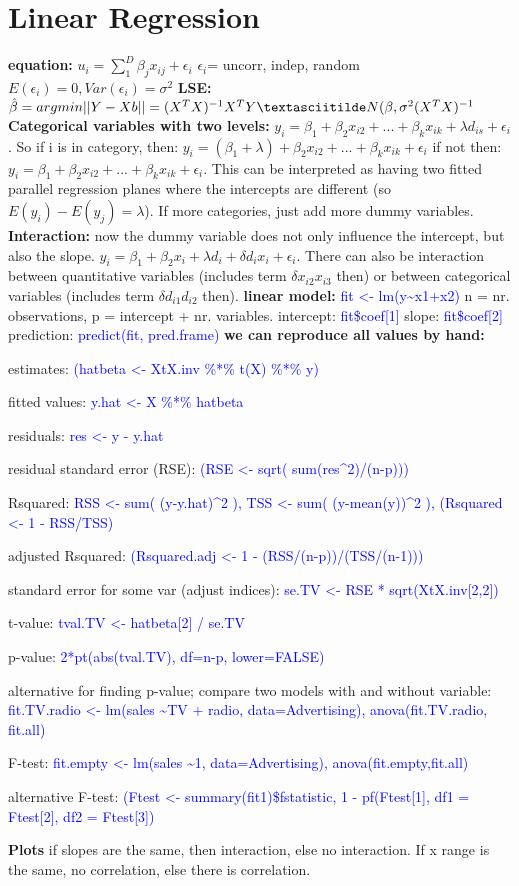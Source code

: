 \section{Linear Regression}
\textbf{equation: }$u_i = \sum_1^D \beta_j x_{ij} + \epsilon_i$
$\epsilon_i $= uncorr, indep, random $E(\epsilon_i) = 0, Var(\epsilon_i) = \sigma^2$
\textbf{LSE:} $\hat\beta = argmin ||Y-Xb|| = (X^TX)^{-1}X^TY \textasciitilde N(\beta,\sigma^2(X^TX)^{-1}$
\textbf{Categorical variables with two levels: } $y_i = \beta_1 + \beta_2 x_{i2}+...+\beta_k x_{ik}+\lambda d_{is}+\epsilon_i$. So if i is in category, then: $y_i = (\beta_1+\lambda) + \beta_2x_{i2}+...+\beta_k x_{ik}+\epsilon_i$ if not then: $y_i = \beta_1 + \beta_2x_{i2}+...+\beta_k x_{ik}+\epsilon_i$. This can be interpreted as having two fitted parallel regression planes where the intercepts are different (so $E(y_i)-E(y_j) = \lambda$). If more categories, just add more dummy variables.
\textbf{Interaction: } now the dummy variable does not only influence the intercept, but also the slope. $y_i = \beta_1 + \beta_2x_i + \lambda d_i + \delta d_i x_i + \epsilon_i$. There can also be interaction between quantitative variables (includes term $\delta x_{i2}x_{i3}$ then) or between categorical variables (includes term $\delta d_{i1}d_{i2}$ then).
\textbf{linear model:} \textcolor{blue}{fit <- lm(y\textasciitilde x1+x2)}
n = nr. observations, p = intercept + nr. variables. intercept: \textcolor{blue}{fit\$coef[1]} slope: \textcolor{blue}{fit\$coef[2]} prediction: \textcolor{blue}{predict(fit, pred.frame)}
\textbf{we can reproduce all values by hand: }
\begin{inparaitem}
\item estimates: \textcolor{blue}{(hatbeta <- XtX.inv \%*\% t(X) \%*\% y) }
\item fitted values: \textcolor{blue}{y.hat <- X \%*\% hatbeta}
\item residuals: \textcolor{blue}{res <- y - y.hat}
\item residual standard error (RSE): \textcolor{blue}{(RSE <- sqrt( sum(res\^{}2)/(n-p)))}
\item Rsquared: \textcolor{blue}{RSS <- sum( (y-y.hat)\^{}2 ),
TSS <- sum( (y-mean(y))\^{}2 ),
(Rsquared <- 1 - RSS/TSS) }
\item adjusted Rsquared: \textcolor{blue}{(Rsquared.adj <- 1 - (RSS/(n-p))/(TSS/(n-1)))}
\item standard error for some var (adjust indices): \textcolor{blue}{se.TV <- RSE * sqrt(XtX.inv[2,2])}
\item t-value: \textcolor{blue}{tval.TV <- hatbeta[2] / se.TV}
\item p-value: \textcolor{blue}{2*pt(abs(tval.TV), df=n-p, lower=FALSE)}
\item alternative for finding p-value; compare two models with and without variable: 
\textcolor{blue}{fit.TV.radio <- lm(sales \textasciitilde TV + radio, data=Advertising), anova(fit.TV.radio, fit.all)}
\item F-test: \textcolor{blue}{fit.empty <- lm(sales \textasciitilde 1, data=Advertising),
anova(fit.empty,fit.all)} 
\item alternative F-test: \textcolor{blue}{(Ftest <- summary(fit1)\$fstatistic, 1 - pf(Ftest[1], df1 = Ftest[2], df2 = Ftest[3])}
\end{inparaitem}
\textbf{Plots} if slopes are the same, then interaction, else no interaction. If x range is the same, no correlation, else there is correlation. 
